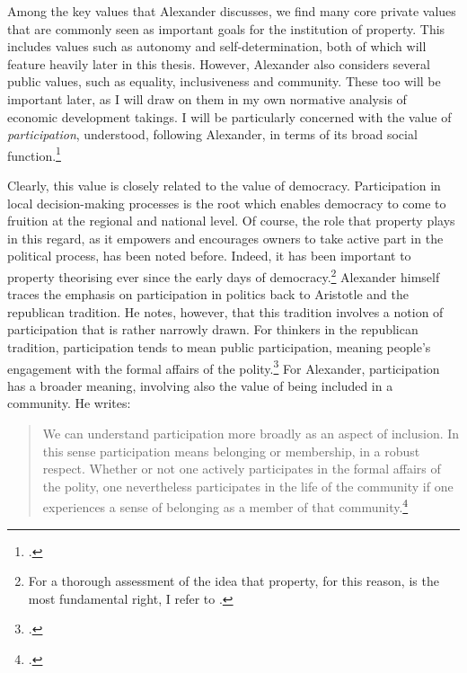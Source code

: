 Among the key values that Alexander discusses, we find many core private values that are commonly seen as important goals for the institution of property. This includes values such as autonomy and self-determination, both of which will feature heavily later in this thesis. However, Alexander also considers several public values, such as equality, inclusiveness and community. These too will be important later, as I will draw on them in my own normative analysis of economic development takings. I will be particularly concerned with the value of {\it participation}, understood, following Alexander, in terms of its broad social function.\footcite[1275-1276]{alexander14}

Clearly, this value is closely related to the value of democracy. Participation in local decision-making processes is the root which enables democracy to come to fruition at the regional and national level. Of course, the role that property plays in this regard, as it empowers and encourages owners to take active part in the political process, has been noted before. Indeed, it has been important to property theorising ever since the early days of democracy.\footnote{For a thorough assessment of the idea that property, for this reason, is the most fundamental right, I refer to \cite{rose96}.} Alexander himself traces the emphasis on participation in politics back to Aristotle and the republican tradition. He notes, however, that this tradition involves a notion of participation that is rather narrowly drawn. For thinkers in the republican tradition, participation tends to mean public participation, meaning people's engagement with the formal affairs of the polity.\footcite[1275]{alexander14} For Alexander, participation has a broader meaning, involving also the value of being included in a community. He writes:

\begin{quote}
We can understand participation more broadly as an aspect of inclusion. In this sense participation means belonging or membership, in a robust respect. Whether or not one actively participates in the formal affairs of the polity, one nevertheless participates in the life of the community if one experiences a sense of belonging as a member of that community.\footcite[1275]{alexander14}
\end{quote}


